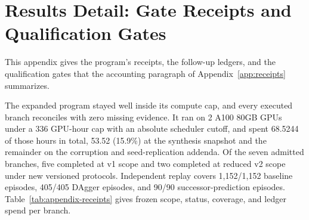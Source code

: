 

\section{Results Detail: Gate Receipts and Qualification Gates}
\label{app:results-gates}

This appendix gives the program's receipts, the follow-up ledgers, and the qualification gates that the accounting paragraph of Appendix~\ref{app:receipts} summarizes.

The expanded program stayed well inside its compute cap, and every executed branch reconciles with zero missing evidence. It ran on 2 A100 80GB GPUs under a 336 GPU-hour cap with an absolute scheduler cutoff, and spent 68.5244 of those hours in total, 53.52 (15.9\%) at the synthesis snapshot and the remainder on the corruption and seed-replication addenda. Of the seven admitted branches, five completed at v1 scope and two completed at reduced v2 scope under new versioned protocols. Independent replay covers 1,152/1,152 baseline episodes, 405/405 DAgger episodes, and 90/90 successor-prediction episodes. Table~\ref{tab:appendix-receipts} gives frozen scope, status, coverage, and ledger spend per branch.

